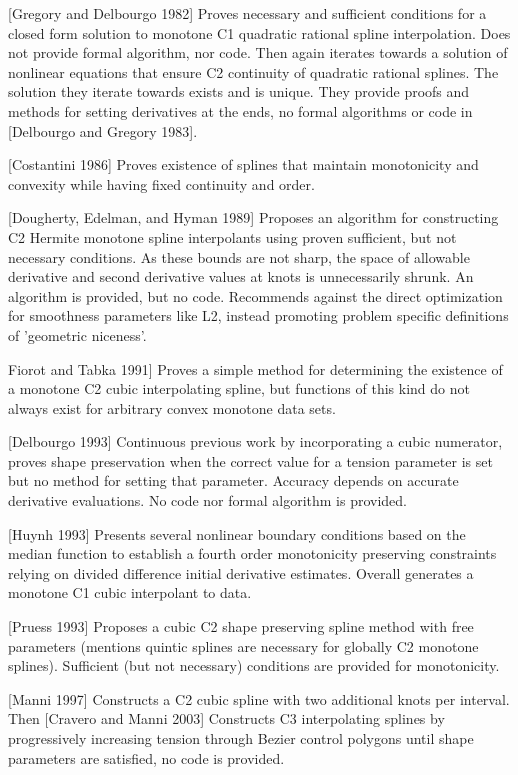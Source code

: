[Gregory and Delbourgo 1982] Proves necessary and sufficient conditions for a closed form solution to monotone C1 quadratic rational spline interpolation. Does not provide formal algorithm, nor code. Then again iterates towards a solution of nonlinear equations that ensure C2 continuity of quadratic rational splines. The solution they iterate towards exists and is unique. They provide proofs and methods for setting derivatives at the ends, no formal algorithms or code in [Delbourgo and Gregory 1983].

[Costantini 1986] Proves existence of splines that maintain monotonicity and convexity while having fixed continuity and order.

[Dougherty, Edelman, and Hyman 1989] Proposes an algorithm for constructing C2 Hermite monotone spline interpolants using proven sufficient, but not necessary conditions. As these bounds are not sharp, the space of allowable derivative and second derivative values at knots is unnecessarily shrunk. An algorithm is provided, but no code. Recommends against the direct optimization for smoothness parameters like L2, instead promoting problem specific definitions of 'geometric niceness'.

Fiorot and Tabka 1991] Proves a simple method for determining the existence of a monotone C2 cubic interpolating spline, but functions of this kind do not always exist for arbitrary convex monotone data sets.

[Delbourgo 1993] Continuous previous work by incorporating a cubic numerator, proves shape preservation when the correct value for a tension parameter is set but no method for setting that parameter. Accuracy depends on accurate derivative evaluations. No code nor formal algorithm is provided.

[Huynh 1993] Presents several nonlinear boundary conditions based on the median function to establish a fourth order monotonicity preserving constraints relying on divided difference initial derivative estimates. Overall generates a monotone C1 cubic interpolant to data.

[Pruess 1993] Proposes a cubic C2 shape preserving spline method with free parameters (mentions quintic splines are necessary for globally C2 monotone splines). Sufficient (but not necessary) conditions are provided for monotonicity.

[Manni 1997] Constructs a C2 cubic spline with two additional knots per interval. Then [Cravero and Manni 2003] Constructs C3 interpolating splines by progressively increasing tension through Bezier control polygons until shape parameters are satisfied, no code is provided.

